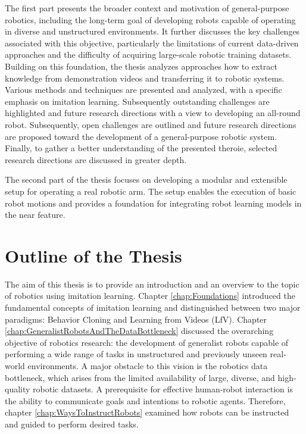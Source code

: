 The first part presents the broader context and motivation of general-purpose robotics, including the long-term goal of developing robots capable of operating in diverse and unstructured environments. It further discusses the key challenges associated with this objective, particularly the limitations of current data-driven approaches and the difficulty of acquiring large-scale robotic training datasets. Building on this foundation, the thesis analyzes approaches how to extract knowledge from demonstration videos and transferring it to robotic systems. Various methods and techniques are presented and analyzed, with a specific emphasis on imitation learning. Subsequently outstanding challenges are highlighted and future research directions with a view to developing an all-round robot. Subsequently, open challenges are outlined and future research directions are proposed toward the development of a general-purpose robotic system. Finally, to gather a better understanding of the presented theroie, selected research directions are discussed in greater depth.


The second part of the thesis focuses on developing a modular and extensible setup for operating a real robotic arm. The setup enables the execution of basic robot motions and provides a foundation for integrating robot learning models in the near feature.



\section{Outline of the Thesis}
The aim of this thesis is to provide an introduction and an overview to the topic of robotics using imitation learning.
Chapter \ref{chap:Foundations} introduced the fundamental concepts of imitation learning and distinguished between two major paradigms: Behavior Cloning and Learning from Videos (LfV). 
Chapter \ref{chap:GeneralistRobotsAndTheDataBottleneck} discussed the overarching objective of robotics research: the development of generalist robots capable of performing a wide range of tasks in unstructured and previously unseen real-world environments. A major obstacle to this vision is the robotics data bottleneck, which arises from the limited availability of large, diverse, and high-quality robotic datasets. 
A prerequisite for effective human-robot interaction is the ability to communicate goals and intentions to robotic agents. Therefore, chapter \ref{chap:WaysToInstructRobots} examined how robots can be instructed and guided to perform desired tasks. 

